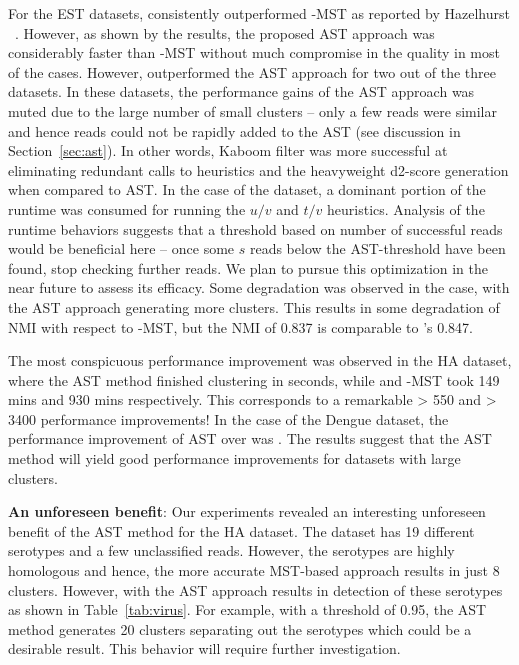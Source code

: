 For the EST datasets,  consistently outperformed
\peace-MST as reported by Hazelhurst \etal~\cite{hazelhurst-11}.
However, as shown by the results, the proposed AST approach was
considerably faster than \peace-MST without much compromise in the
quality in most of the cases.  However,  outperformed
the AST approach for two out of the three datasets.  In these
datasets, the performance gains of the AST approach was muted due to
the large number of small clusters -- \ie\/ only a few reads were
similar and hence reads could not be rapidly added to the AST (see
discussion in Section~\ref{sec:ast}).  In other words, Kaboom filter
was more successful at eliminating redundant calls to heuristics and
the heavyweight d2-score generation when compared to AST.  In the case
of the  dataset, a dominant portion of the runtime was
consumed for running the $u/v$ and $t/v$ heuristics.  Analysis of the
runtime behaviors suggests that a threshold based on number of
successful reads would be beneficial here -- \ie\/ once some $s$ reads
below the AST-threshold have been found, stop checking further reads.
We plan to pursue this optimization in the near future to assess its
efficacy.  Some degradation was observed in the  case, with the
AST approach generating more clusters.  This results in some
degradation of NMI with respect to \peace-MST, but the NMI of 0.837 is
comparable to 's 0.847.




The most conspicuous performance improvement was observed in the HA
dataset, where the AST method finished clustering in 
seconds, while  and \peace-MST took 149 mins and 930
mins respectively.  This corresponds to a remarkable \textgreater\/
550\texttimes\/ and \textgreater\/ 3400\texttimes\/ performance
improvements!  In the case of the Dengue dataset, the performance
improvement of AST over  was \texttimes.  The
results suggest that the AST method will yield good performance
improvements for datasets with large clusters.

\textbf{An unforeseen benefit}: Our experiments revealed an
interesting unforeseen benefit of the AST method for the HA dataset.
The dataset has 19 different serotypes and a few unclassified
reads. However, the serotypes are highly homologous and hence, the
more accurate MST-based approach results in just 8 clusters.  However,
with the AST approach results in detection of these serotypes as shown
in Table~\ref{tab:virus}.  For example, with a threshold of 0.95, the
AST method generates 20 clusters separating out the serotypes which
could be a desirable result.  This behavior will require further
investigation.

